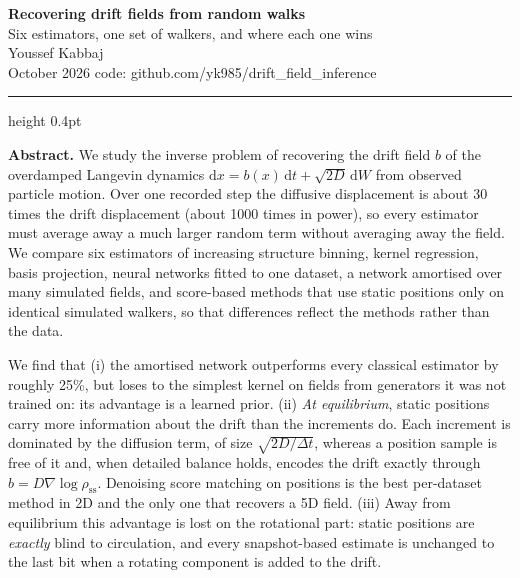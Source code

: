 \documentclass[11pt,a4paper]{article}
\newcommand{\code}[1]{{\ttfamily\small #1}}
\newcommand{\dt}{\Delta t}
\begin{document}
\begin{center}
{\LARGE\bfseries\color{ink} Recovering drift fields from random walks}\\[0.3em]
{\large\color{accent} Six estimators, one set of walkers, and where each one wins}\\[0.8em]
{\large Youssef Kabbaj}\\[0.3em]
{\color{ink3}\small October 2026 \quad\textbullet\quad code: \code{github.com/yk985/drift\_field\_inference}}
\end{center}

\vspace{0.2em}\hrule height 0.4pt \vspace{0.8em}

\begin{keybox}
\textbf{Abstract.} We study the inverse problem of recovering the drift field $b$ of the
overdamped Langevin dynamics $\mathrm dx = b(x)\,\mathrm dt+\sqrt{2D}\,\mathrm dW$ from observed
particle motion. Over one recorded step the diffusive displacement is about 30 times the drift
displacement (about 1000 times in power), so every estimator must average away a much larger
random term without averaging away the field. We compare six estimators of increasing
structure \textemdash{} binning, kernel regression, basis projection, neural networks fitted
to one dataset, a network amortised over many simulated fields, and score-based methods that
use static positions only \textemdash{} on identical simulated walkers, so that differences
reflect the methods rather than the data.

We find that (i) the amortised network outperforms every classical estimator by roughly
25\%, but loses to the simplest kernel on fields from generators it was not
trained on: its advantage is a learned prior. (ii) \emph{At equilibrium}, static positions
carry more information about the drift than the increments do. Each increment is dominated by
the diffusion term, of size $\sqrt{2D/\dt}$, whereas a position sample is free of it and, when
detailed balance holds, encodes the drift exactly through $b = D\nabla\log\rho_{\mathrm{ss}}$.
Denoising score matching on positions is the best per-dataset method in 2D and the only one
that recovers a 5D field. (iii) Away from equilibrium this advantage is lost on the rotational
part: static positions are \emph{exactly} blind to circulation, and every snapshot-based estimate
is unchanged to the last bit when a rotating component is added to the drift.
\end{keybox}
\end{document}
